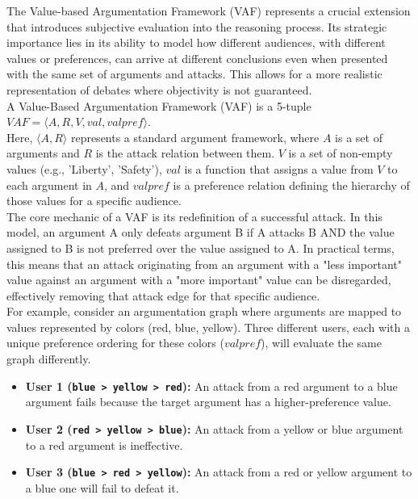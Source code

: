 \documentclass{scrbook}
\begin{document}
The Value-based Argumentation Framework (VAF) represents a crucial extension that introduces subjective evaluation into the reasoning process. Its strategic importance lies in its ability to model how different audiences, with different values or preferences, can arrive at different conclusions even when presented with the same set of arguments and attacks. This allows for a more realistic representation of debates where objectivity is not guaranteed. \\

A Value-Based Argumentation Framework (VAF) is a 5-tuple $VAF=⟨A,R,V,val,valpref⟩$. \\

Here, $⟨A,R⟩$ represents a standard argument framework, where $A$ is a set of arguments and $R$ is the attack relation between them. $V$ is a set of non-empty values (e.g., 'Liberty', 'Safety'), $val$ is a function that assigns a value from $V$ to each argument in $A$, and $valpref$ is a preference relation defining the hierarchy of those values for a specific audience. \\

The core mechanic of a VAF is its redefinition of a successful attack. In this model, an argument A only defeats argument B if A attacks B AND the value assigned to B is not preferred over the value assigned to A. In practical terms, this means that an attack originating from an argument with a "less important" value against an argument with a "more important" value can be disregarded, effectively removing that attack edge for that specific audience. \\

For example, consider an argumentation graph where arguments are mapped to values represented by colors (red, blue, yellow). Three different users, each with a unique preference ordering for these colors ($valpref$), will evaluate the same graph differently. \\

\begin{itemize}
    \item 
    \textbf{User 1 (\texttt{blue > yellow > red}):} An attack from a red argument to a blue argument fails because the target argument has a higher-preference value.

    \item 
    \textbf{User 2 (\texttt{red > yellow > blue}):} An attack from a yellow or blue argument to a red argument is ineffective.

    \item 
    \textbf{User 3 (\texttt{blue > red > yellow}):} An attack from a red or yellow argument to a blue one will fail to defeat it.
\end{itemize}
\end{document}

